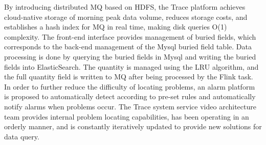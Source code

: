\documentclass[winfonts,master,twoside]{njuthesis}
\begin{document}
\begin{englishabstract}
By introducing distributed MQ based on HDFS, the Trace platform achieves cloud-native storage of morning peak data volume, reduces storage costs, and establishes a hash index for MQ in real time, making disk queries O(1) complexity. The front-end interface provides management of buried fields, which corresponds to the back-end management of the Mysql buried field table. Data processing is done by querying the buried fields in Mysql and writing the buried fields into ElasticSearch. The quantity is managed using the LRU algorithm, and the full quantity field is written to MQ after being processed by the Flink task. In order to further reduce the difficulty of locating problems, an alarm platform is proposed to automatically detect according to pre-set rules and automatically notify alarms when problems occur. The Trace system service video architecture team provides internal problem locating capabilities, has been operating in an orderly manner, and is constantly iteratively updated to provide new solutions for data query.

\end{englishabstract}

%
%
%
%

\tableofcontents

\listoffigures

\listoftables

\mainmatter

\end{document}
